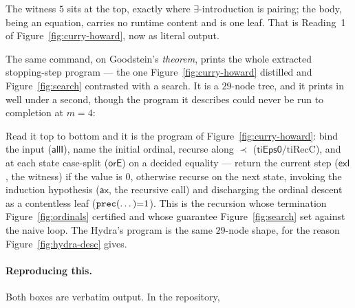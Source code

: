 \documentclass[11pt]{article}
\begin{document}
\begin{center}
\end{center}

\noindent
The witness $5$ sits at the top, exactly where $\exists$-introduction is pairing;
the body, being an equation, carries no runtime content and is one leaf. That is
Reading~1 of Figure~\ref{fig:curry-howard}, now as literal output.

The same command, on Goodstein's \emph{theorem}, prints the whole extracted
stopping-step program --- the one Figure~\ref{fig:curry-howard} distilled and
Figure~\ref{fig:search} contrasted with a search. It is a $29$-node tree, and it
prints in well under a second, though the program it describes could never be run
to completion at $m=4$:

\begin{center}
\end{center}

\noindent
Read it top to bottom and it is the program of Figure~\ref{fig:curry-howard}: bind
the input ($\mathsf{allI}$), name the initial ordinal, recurse along $\prec$
($\mathsf{tiEps0}/\mathrm{tiRecC}$), and at each state case-split
($\mathsf{orE}$) on a decided equality --- return the current step
($\mathsf{exI}$, the witness) if the value is $0$, otherwise recurse on the next
state, invoking the induction hypothesis ($\mathsf{ax}$, the recursive call) and
discharging the ordinal descent as a contentless leaf ($\texttt{prec}(\dots){=}1$).
This is the recursion whose termination Figure~\ref{fig:ordinals} certified and
whose guarantee Figure~\ref{fig:search} set against the naive loop. The Hydra's
program is the same $29$-node shape, for the reason Figure~\ref{fig:hydra-desc}
gives.

\paragraph{Reproducing this.} Both boxes are verbatim output. In the repository,
\end{document}
